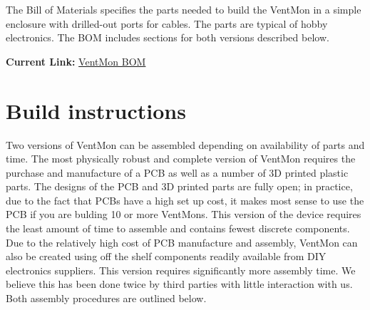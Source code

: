 \documentclass[11pt, letterpaper]{article}
\begin{document}



The Bill of Materials specifies the parts needed to build the VentMon in a simple enclosure with drilled-out ports for cables.
The parts are typical of hobby electronics. The BOM includes sections for both versions described below.

{\bf Current Link:} \href{https://doi.org/10.5281/zenodo.4289426}{VentMon  BOM}



\section{Build instructions}

Two versions of VentMon can be assembled depending on availability of parts and time.
The most physically robust and complete version of VentMon requires the purchase and manufacture of a PCB as well as
a number of 3D printed plastic parts. The designs of the PCB and 3D printed parts are fully open;
in practice, due to the fact that PCBs have a high set up cost, it makes most sense to use the PCB if you are bulding 10 or more VentMons.
This version of the device requires the least amount of time to assemble and contains fewest discrete components.
Due to the relatively high cost of PCB manufacture and assembly, VentMon can also be created using off the shelf components
readily available from DIY electronics suppliers. This version requires significantly more assembly time.
We believe this has been done twice by third parties with little interaction with us. Both assembly procedures are outlined below.
\end{document}
